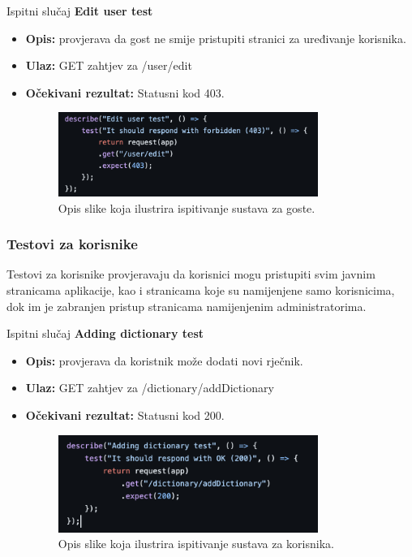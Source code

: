 			Ispitni slučaj \textbf{Edit user test}
			\begin{itemize}
				\item \textbf{Opis:} provjerava da gost ne smije pristupiti stranici za uređivanje korisnika.
				\item \textbf{Ulaz:} GET zahtjev za /user/edit
				\item \textbf{Očekivani rezultat:} Statusni kod 403.
				\begin{figure}[h]
					\centering
					\includegraphics[width=0.8\textwidth]{slike/testovi/guest_edit_profile_test.png}
					\caption{Opis slike koja ilustrira ispitivanje sustava za goste.}
					\label{fig:testovi_gosti_slika}
				\end{figure}
			\end{itemize}
			
			\subsubsection{Testovi za korisnike}
			Testovi za korisnike provjeravaju da korisnici mogu pristupiti svim javnim stranicama aplikacije,
			kao i stranicama koje su namijenjene samo korisnicima,
			dok im je zabranjen pristup stranicama namijenjenim administratorima.

			Ispitni slučaj \textbf{Adding dictionary test}
			\begin{itemize}
				\item \textbf{Opis:} provjerava da koristnik može dodati novi rječnik.
				\item \textbf{Ulaz:} GET zahtjev za /dictionary/addDictionary
				\item \textbf{Očekivani rezultat:} Statusni kod 200.
				\begin{figure}[h]
					\centering
					\includegraphics[width=0.8\textwidth]{slike/testovi/user_add_dictionary_test.png}
					\caption{Opis slike koja ilustrira ispitivanje sustava za korisnika.}
					\label{fig:testovi_korisnik_slika}
				\end{figure}
			\end{itemize}

